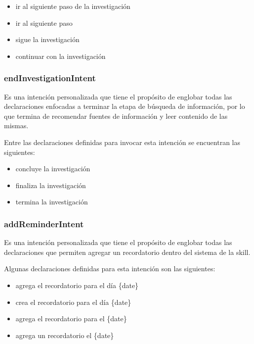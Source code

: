\begin{itemize}
  \item ir al siguiente paso de la investigación
  \item ir al siguiente paso
  \item sigue la investigación
  \item continuar con la investigación
\end{itemize}


\subsubsection{endInvestigationIntent}
\label{endInvestigationIntentcapIV}

Es una intención personalizada que tiene el propósito de englobar todas las declaraciones enfocadas a terminar la etapa de búsqueda de información, por lo que termina de recomendar fuentes de información y leer contenido de las mismas.

Entre las declaraciones definidas para invocar esta intención se encuentran las siguientes:

\begin{itemize}
  \item concluye la investigación
  \item finaliza la investigación
  \item termina la investigación
\end{itemize}


\subsubsection{addReminderIntent}
\label{addReminderIntentcapIV}

Es una intención personalizada que tiene el propósito de englobar todas las declaraciones que permiten agregar un recordatorio dentro del sistema de la skill.

Algunas declaraciones definidas para esta intención son las siguientes:

\begin{itemize}
  \item agrega el recordatorio para el día \{date\}
  \item crea el recordatorio para el día \{date\}
  \item agrega el recordatorio para el \{date\}
  \item agrega un recordatorio el \{date\}
\end{itemize}

